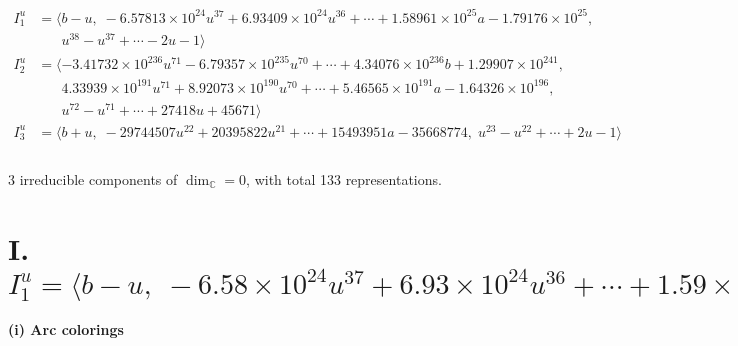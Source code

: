 \documentclass[1p]{elsarticle_modified}
\theoremstyle{definition}
\begin{document}
\begin{align*}
I^u_{1}&=\langle 
b- u,\;-6.57813\times10^{24} u^{37}+6.93409\times10^{24} u^{36}+\cdots+1.58961\times10^{25} a-1.79176\times10^{25},\\
\phantom{I^u_{1}}&\phantom{= \langle  }u^{38}- u^{37}+\cdots-2 u-1\rangle \\
I^u_{2}&=\langle 
-3.41732\times10^{236} u^{71}-6.79357\times10^{235} u^{70}+\cdots+4.34076\times10^{236} b+1.29907\times10^{241},\\
\phantom{I^u_{2}}&\phantom{= \langle  }4.33939\times10^{191} u^{71}+8.92073\times10^{190} u^{70}+\cdots+5.46565\times10^{191} a-1.64326\times10^{196},\\
\phantom{I^u_{2}}&\phantom{= \langle  }u^{72}- u^{71}+\cdots+27418 u+45671\rangle \\
I^u_{3}&=\langle 
b+u,\;-29744507 u^{22}+20395822 u^{21}+\cdots+15493951 a-35668774,\;u^{23}- u^{22}+\cdots+2 u-1\rangle \\
\\
\end{align*}
\raggedright * 3 irreducible components of $\dim_{\mathbb{C}}=0$, with total 133 representations.\\
\newpage
\renewcommand{\arraystretch}{1}
\centering \section*{I. $I^u_{1}= \langle b- u,\;-6.58\times10^{24} u^{37}+6.93\times10^{24} u^{36}+\cdots+1.59\times10^{25} a-1.79\times10^{25},\;u^{38}- u^{37}+\cdots-2 u-1 \rangle$}
\flushleft \textbf{(i) Arc colorings}\\
\end{document}
